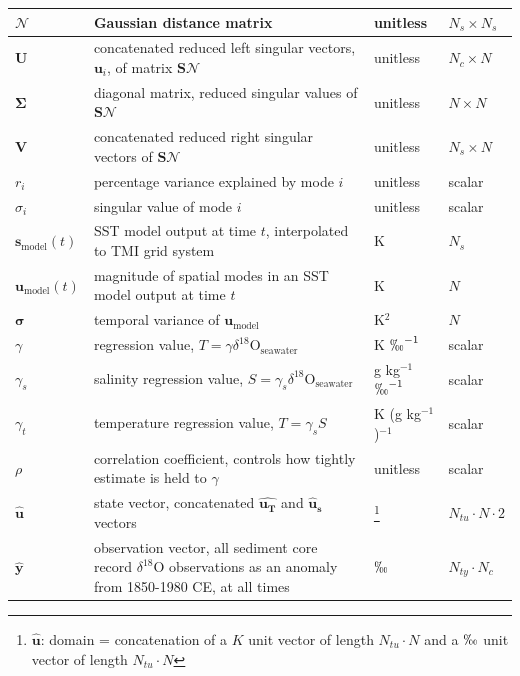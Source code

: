 \documentclass[draft]{agujournal2019}
\begin{document}
\begin{longtable}{| p{0.75in}|p{3.5in}|p{1in}|p{1in} |}
  \hline
  $\mathbf{\mathcal{N}}$ & Gaussian distance matrix & unitless & $N_{s} \times N_{s}$ \\
  \hline
  $\mathbf{U}$ & concatenated reduced left singular vectors, $\mathbf{u}_{i}$, of matrix $\mathbf{S\mathcal{N}}$ & unitless & $N_{c} \times N$ \\
  \hline
  $\mathbf{\Sigma}$ & diagonal matrix, reduced singular values of $\mathbf{S\mathcal{N}}$ & unitless & $N \times N $ \\
  \hline
  $\mathbf{V}$ & concatenated reduced right singular vectors of $\bm{S\mathcal{N}}$ & unitless & $N_{s} \times N$ \\
  \hline
  $r_{i}$ & percentage variance explained by mode $i$ & unitless & scalar \\
  \hline
  $\sigma_{i}$ & singular value of mode $i$ & unitless & scalar \\
  \hline
  $\mathbf{s_{\mathrm{model}}}(t)$ & SST model output at time $t$, interpolated to TMI grid system & K & $N_{s}$ \\
  \hline
  $\mathbf{u_{\mathrm{model}}}(t)$ & magnitude of spatial modes in an SST model output at time $t$ & K & $N$\\
  \hline
  $\bm{\sigma}$ & temporal variance of $\mathbf{u_{\mathrm{model}}}$ & K$^{2}$ & $N$\\
  \hline
  $\gamma$ & regression value, $T = \gamma \delta^{18}\mathrm{O}_{\mathrm{seawater}}$ & K $\permil^{-1}$ & scalar \\
  \hline
  $\gamma_{s}$ & salinity regression value, $S = \gamma_{s} \delta^{18}\mathrm{O}_{\mathrm{seawater}}$ & g kg$^{-1}$ $\permil^{-1}$ & scalar \\
  \hline
  $\gamma_{t}$ & temperature regression value, $T = \gamma_{s} S$ & K (g kg$^{-1}$)$^{-1}$ & scalar \\
  \hline
  $\rho$ & correlation coefficient, controls how tightly estimate is held to $\gamma$ & unitless & scalar \\ 
  \hline
  $\mathbf{\hat{u}}$ & state vector, concatenated $\mathbf{\hat{u_{T}}}$ and $\mathbf{\hat{u}_{s}}$ vectors& \footnote{$\bm{\hat{u}}$: domain = concatenation of a $K$ unit vector of length $N_{tu} \cdot N$ and a $\permil$ unit vector of length $N_{tu}\cdot N$} & $N_{tu} \cdot N \cdot 2 $\\
  \hline
  $\mathbf{\hat{y}}$ & observation vector, all sediment core record $\delta^{18}\mathrm{O}$ observations as an anomaly from 1850-1980 CE, at all times & $\permil$ & $N_{ty} \cdot N_{c}$ \\

\end{longtable}
\end{document}
